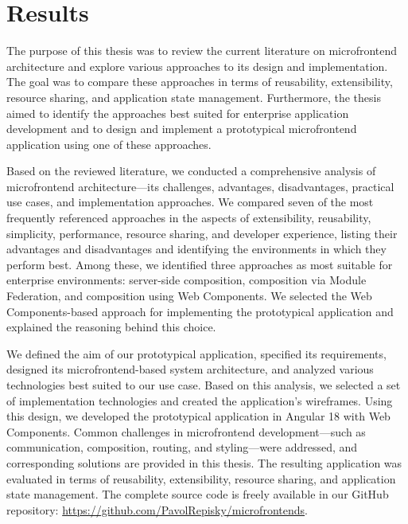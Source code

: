 \section{Results}
The purpose of this thesis was to review the current literature on microfrontend architecture and explore various approaches to its design and implementation. The goal was to compare these approaches in terms of reusability, extensibility, resource sharing, and application state management. Furthermore, the thesis aimed to identify the approaches best suited for enterprise application development and to design and implement a prototypical microfrontend application using one of these approaches.

Based on the reviewed literature, we conducted a comprehensive analysis of microfrontend architecture—its challenges, advantages, disadvantages, practical use cases, and implementation approaches. We compared seven of the most frequently referenced approaches in the aspects of extensibility, reusability, simplicity, performance, resource sharing, and developer experience, listing their advantages and disadvantages and identifying the environments in which they perform best. Among these, we identified three approaches as most suitable for enterprise environments: server-side composition, composition via Module Federation, and composition using Web Components. We selected the Web Components-based approach for implementing the prototypical application and explained the reasoning behind this choice.

We defined the aim of our prototypical application, specified its requirements, designed its microfrontend-based system architecture, and analyzed various technologies best suited to our use case. Based on this analysis, we selected a set of implementation technologies and created the application's wireframes. Using this design, we developed the prototypical application in Angular 18 with Web Components. Common challenges in microfrontend development—such as communication, composition, routing, and styling—were addressed, and corresponding solutions are provided in this thesis. The resulting application was evaluated in terms of reusability, extensibility, resource sharing, and application state management. The complete source code is freely available in our GitHub repository: \url{https://github.com/PavolRepisky/microfrontends}.